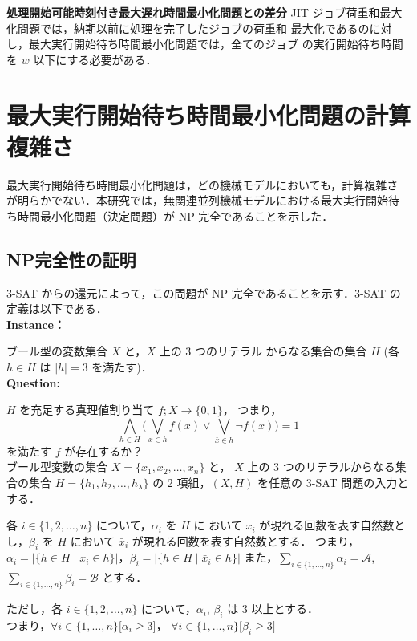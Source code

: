 \documentclass[12pt]{optlab-bachelor}
\begin{document}
\textbf{処理開始可能時刻付き最大遅れ時間最小化問題との差分}
JIT ジョブ荷重和最大化問題では，納期以前に処理を完了したジョブの荷重和
最大化であるのに対し，最大実行開始待ち時間最小化問題では，全てのジョブ
の実行開始待ち時間を $w$ 以下にする必要がある．


\chapter{最大実行開始待ち時間最小化問題の計算複雑さ}
最大実行開始待ち時間最小化問題は，どの機械モデルにおいても，計算複雑さ
が明らかでない．本研究では，無関連並列機械モデルにおける最大実行開始待
ち時間最小化問題（決定問題）が NP 完全であることを示した．
\section{NP完全性の証明}
3-SAT からの還元によって，この問題が NP  完全であることを示す．3-SAT
の定義は以下である．\\

\noindent \textbf{Instance：}

ブール型の変数集合 $X$ と，$X$ 上の 3 つのリテラル
からなる集合の集合 $H$ (各 $h \in H$ は $|h| = 3$ を満たす)．\\

\noindent \textbf{Question:}

$H$ を充足する真理値割り当て $f ; X \to \{0,1\}$，
つまり，
$$\displaystyle \bigwedge_{h \in H} \bigg(\bigvee_{x \in h}f(x) \lor
\bigvee_{\bar x \in h}\lnot f(x) \bigg) = 1$$
を満たす $f$ が存在するか？\\

ブール型変数の集合 $X =\{x_1, x_2,\ldots ,x_n\}$ と， $X$ 上の 3 つのリテラルからなる集合の集合 $H =\{h_1, h_2,\ldots ,h_{\lambda}\}$ の 2 項組，$(X,H)$ を任意の 3-SAT 問題の入力とする．

各 $i \in \{1,2,\ldots, n\}$ について，$\alpha_i$ を $H$ に おいて $x_i$ が現れる回数を表す自然数とし，$\beta_i$ を $H$ において $\bar x_i$ が現れる回数を表す自然数とする．
つまり，$\alpha_i = \big|\{h \in H \mid x_i \in h\}\big|$，$\beta_i = \big|\{h \in H \mid \bar x_i \in h\}\big|$
また，$\displaystyle \sum_{i \in \{1,\ldots,n\}} \alpha_i = \mathcal{A}$, $\displaystyle \sum_{i \in \{1,\ldots,n\}} \beta_i = \mathcal{B}$  とする．

ただし，各 $i \in \{1,2,\ldots, n\}$ について，$\alpha_i$, $\beta_i$ は 3 以上とする．\\
つまり，$\forall i \in \{1,\ldots,n\}\big[\alpha_i \ge 3\big]$，
$\forall i \in \{1,\ldots,n\}\big[\beta_i \ge 3\big]$
\end{document}
